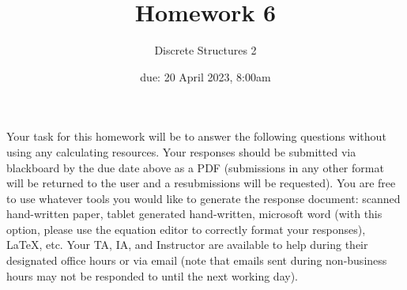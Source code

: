 \documentclass[11pt, oneside]{article}   	%
\title{Homework 6}
\author{Discrete Structures 2}
\date{due: 20 April 2023, 8:00am}							%
\begin{document}
\maketitle

Your task for this homework will be to answer the following questions without using any calculating resources. 
Your responses should be submitted via blackboard by the due date above as a PDF (submissions in any other format will be returned to the user and a resubmissions will be requested). 
You are free to use whatever tools you would like to generate the response document: 
scanned hand-written paper, 
tablet generated hand-written, 
microsoft word (with this option, please use the equation editor to correctly format your responses), 
\LaTeX, etc.
Your TA, IA, and Instructor are available to help during their designated office hours or via email 
(note that emails sent during non-business hours may not be responded to until the next working day). 
\end{document}
